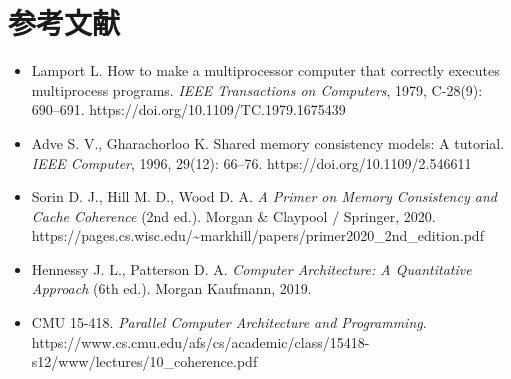 \section*{参考文献}
\begin{itemize}
\item Lamport L. How to make a multiprocessor computer that correctly executes multiprocess programs. \emph{IEEE Transactions on Computers}, 1979, C-28(9): 690–691. https://doi.org/10.1109/TC.1979.1675439
\item Adve S. V., Gharachorloo K. Shared memory consistency models: A tutorial. \emph{IEEE Computer}, 1996, 29(12): 66–76. https://doi.org/10.1109/2.546611
\item Sorin D. J., Hill M. D., Wood D. A. \emph{A Primer on Memory Consistency and Cache Coherence} (2nd ed.). Morgan \& Claypool / Springer, 2020. https://pages.cs.wisc.edu/\textasciitilde{}markhill/papers/primer2020\_2nd\_edition.pdf
\item Hennessy J. L., Patterson D. A. \emph{Computer Architecture: A Quantitative Approach} (6th ed.). Morgan Kaufmann, 2019.
\item CMU 15-418. \emph{Parallel Computer Architecture and Programming}. https://www.cs.cmu.edu/afs/cs/academic/class/15418-s12/www/lectures/10\_coherence.pdf
\end{itemize}
